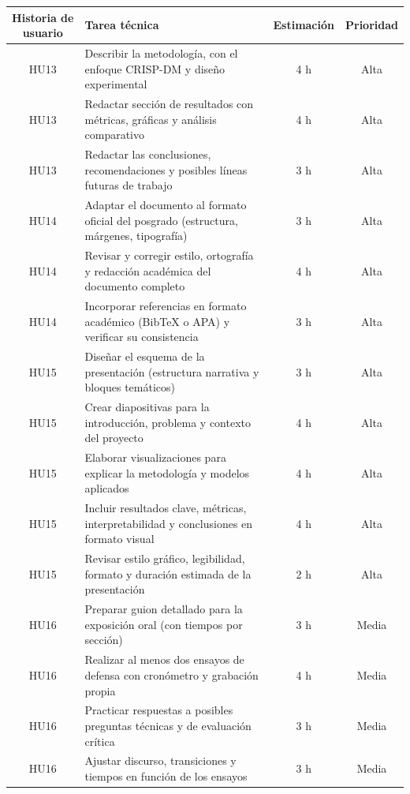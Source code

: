 \documentclass[
11pt, %
]{charter}
\begin{document}
\begin{table}[htpb]
\centering
\begin{tabularx}{\linewidth}{@{}|c|X|c|c|@{}}
\hline
\rowcolor[HTML]{C0C0C0}
Historia de usuario & Tarea técnica & Estimación & Prioridad \\ \hline

HU13 & Describir la metodología, con el enfoque CRISP-DM y diseño experimental & 4 h & Alta \\ \hline
HU13 & Redactar sección de resultados con métricas, gráficas y análisis comparativo & 4 h & Alta \\ \hline
HU13 & Redactar las conclusiones, recomendaciones y posibles líneas futuras de trabajo & 3 h & Alta \\ \hline

HU14 & Adaptar el documento al formato oficial del posgrado (estructura, márgenes, tipografía) & 3 h & Alta \\ \hline
HU14 & Revisar y corregir estilo, ortografía y redacción académica del documento completo & 4 h & Alta \\ \hline
HU14 & Incorporar referencias en formato académico (BibTeX o APA) y verificar su consistencia & 3 h & Alta \\ \hline

HU15 & Diseñar el esquema de la presentación (estructura narrativa y bloques temáticos) & 3 h & Alta \\ \hline
HU15 & Crear diapositivas para la introducción, problema y contexto del proyecto & 4 h & Alta \\ \hline
HU15 & Elaborar visualizaciones para explicar la metodología y modelos aplicados & 4 h & Alta \\ \hline
HU15 & Incluir resultados clave, métricas, interpretabilidad y conclusiones en formato visual & 4 h & Alta \\ \hline
HU15 & Revisar estilo gráfico, legibilidad, formato y duración estimada de la presentación & 2 h & Alta \\ \hline

HU16 & Preparar guion detallado para la exposición oral (con tiempos por sección) & 3 h & Media \\ \hline
HU16 & Realizar al menos dos ensayos de defensa con cronómetro y grabación propia & 4 h & Media \\ \hline
HU16 & Practicar respuestas a posibles preguntas técnicas y de evaluación crítica & 3 h & Media \\ \hline
HU16 & Ajustar discurso, transiciones y tiempos en función de los ensayos & 3 h & Media \\ \hline

\end{tabularx}
\end{table}
\end{document}
